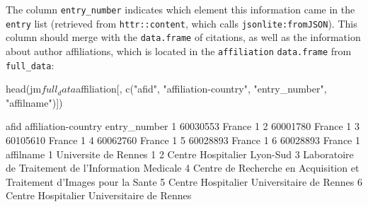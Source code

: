 \begin{Schunk}
\end{Schunk}

The column \texttt{entry\_number} indicates which element this
information came in the \texttt{entry} list (retrieved from
\texttt{httr::content}, which calls \texttt{jsonlite:fromJSON}). This
column should merge with the \texttt{data.frame} of citations, as well
as the information about author affiliations, which is located in the
\texttt{affiliation} \texttt{data.frame} from \texttt{full\_data}:

\begin{Schunk}
\begin{Sinput}
head(jm$full_data$affiliation[, c("afid", "affiliation-country", "entry_number",  "affilname")])
\end{Sinput}
\begin{Soutput}
      afid affiliation-country entry_number
1 60030553              France            1
2 60001780              France            1
3 60105610              France            1
4 60062760              France            1
5 60028893              France            1
6 60028893              France            1
                                                                affilname
1                                                  Universite de Rennes 1
2                                             Centre Hospitalier Lyon-Sud
3                     Laboratoire de Traitement de l'Information Medicale
4 Centre de Recherche en Acquisition et Traitement d'Images pour la Sante
5                              Centre Hospitalier Universitaire de Rennes
6                              Centre Hospitalier Universitaire de Rennes
\end{Soutput}
\end{Schunk}

